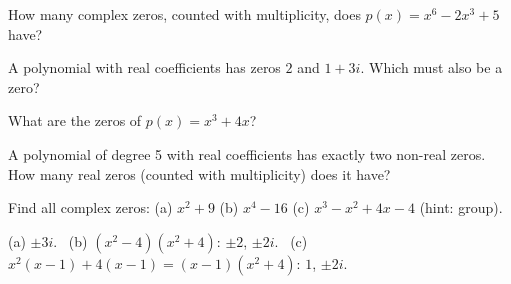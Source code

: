 \begin{exo}{}
How many complex zeros, counted with multiplicity, does $p(x)=x^6-2x^3+5$ have?
\end{exo}
\begin{exo}{}
A polynomial with real coefficients has zeros $2$ and $1+3i$. Which must also be a zero?
\end{exo}
\begin{exo}{}
What are the zeros of $p(x)=x^3+4x$?
\end{exo}
\begin{exo}{}
A polynomial of degree 5 with real coefficients has exactly two non-real zeros. How many real zeros (counted with multiplicity) does it have?
\end{exo}
\begin{exo}{}
Find all complex zeros: (a) $x^2+9$ \quad (b) $x^4-16$ \quad (c) $x^3-x^2+4x-4$ (hint: group).
\begin{solution}
(a) $\pm3i$. \ (b) $(x^2-4)(x^2+4)$: $\pm2$, $\pm2i$. \ (c) $x^2(x-1)+4(x-1)=(x-1)(x^2+4)$: $1$, $\pm2i$.
\end{solution}
\end{exo}

